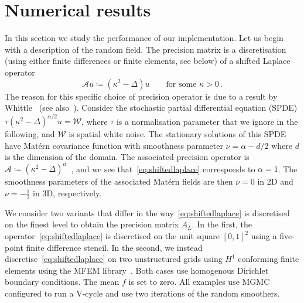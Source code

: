 \documentclass[
fontsize=11pt,
paper=a4,
numbers=noenddot
]{scrartcl}
\begin{document}
\section{Numerical results}\label{sec:numerics}
In this section we study the performance of our implementation.
Let us begin with a description of the random field. The precision matrix is a discretisation (using either finite differences or finite elements, see below) of a shifted Laplace operator
\begin{equation}
    \label{eq:shiftedlaplace}
    \mathcal{A} u \coloneqq (\kappa^2 - \Delta) u \qquad \text{for some } \kappa > 0 \,.
\end{equation}
The reason for this specific choice of precision operator is due to a result by Whittle~\cite{whittle1954,whittle1963} (see also~\cite{lindgren,lindgrenSPDEApproachGaussian2022}). Consider the stochastic partial differential equation (SPDE) $\tau (\kappa^2 - \Delta)^{\alpha/2} u = \mathcal{W}$, where $\tau$ is a normalisation parameter that we ignore in the following, and $\mathcal{W}$ is spatial white noise. The stationary solutions of this SPDE have Mat\'ern covariance function with smoothness parameter $\nu = \alpha - d/2$ where $d$ is the dimension of the domain. The associated precision operator is $\mathcal{A} \coloneqq {(\kappa^2 - \Delta)}^\alpha$~\cite[Sec.\ 2.2]{lindgrenSPDEApproachGaussian2022}, and we see that~\eqref{eq:shiftedlaplace} corresponds to $\alpha = 1$. The smoothness parameters of the associated Mat\'ern fields are then $\nu = 0$ in 2D and $\nu = -\frac{1}{2}$ in 3D, respectively.

We consider two variants that differ in the way~\eqref{eq:shiftedlaplace} is discretised on the finest level to obtain the precision matrix $A_L$. In the first, the operator~\eqref{eq:shiftedlaplace} is discretised on the unit square ${[0,1]}^2$ using a five-point finite difference stencil. In the second, we instead discretise~\eqref{eq:shiftedlaplace} on two unstructured grids using $H^1$ conforming finite elements using the MFEM library~\cite{mfem,mfem-web}. Both cases use homogenous Dirichlet boundary conditions. The mean $f$ is set to zero. All examples use MGMC configured to run a V-cycle and use two iterations of the random smoothers.
\end{document}
